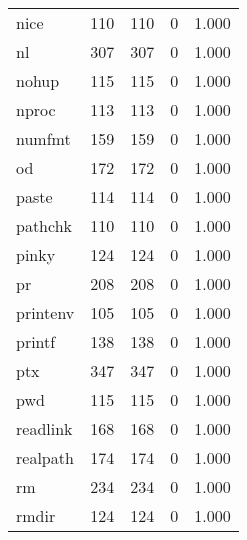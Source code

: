 \begin{longtable}{lp{3.0cm}p{3.0cm}p{3.0cm}p{3.0cm}}
nice      &                     110 &              110 &                 0 &                        1.000 \\
nl        &                     307 &              307 &                 0 &                        1.000 \\
nohup     &                     115 &              115 &                 0 &                        1.000 \\
nproc     &                     113 &              113 &                 0 &                        1.000 \\
numfmt    &                     159 &              159 &                 0 &                        1.000 \\
od        &                     172 &              172 &                 0 &                        1.000 \\
paste     &                     114 &              114 &                 0 &                        1.000 \\
pathchk   &                     110 &              110 &                 0 &                        1.000 \\
pinky     &                     124 &              124 &                 0 &                        1.000 \\
pr        &                     208 &              208 &                 0 &                        1.000 \\
printenv  &                     105 &              105 &                 0 &                        1.000 \\
printf    &                     138 &              138 &                 0 &                        1.000 \\
ptx       &                     347 &              347 &                 0 &                        1.000 \\
pwd       &                     115 &              115 &                 0 &                        1.000 \\
readlink  &                     168 &              168 &                 0 &                        1.000 \\
realpath  &                     174 &              174 &                 0 &                        1.000 \\
rm        &                     234 &              234 &                 0 &                        1.000 \\
rmdir     &                     124 &              124 &                 0 &                        1.000 \\

\end{longtable}
